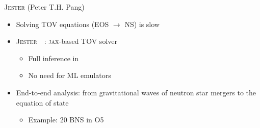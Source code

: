 \documentclass[usenames,dvipsnames,t]{beamer}
\newcommand{\ghlink}[1]{\href{https://github.com/#1}{\textcolor{black}{\faGithub}}}
\begin{document}
\begin{frame}{\textsc{Jester} \small (Peter T.H. Pang) \normalsize}
  \def\x{2mm}

  \begin{itemize}


    \item Solving TOV equations (EOS $\rightarrow$ NS) is slow

    \vspace{\x}

    \item<2-> \textsc{Jester}~\ghlink{nuclear-multimessenger-astronomy/jester}~\cite{Wouters:2025zju}: \textsc{jax}-based TOV solver
    \begin{itemize}
      \item Full inference in 
      \item No need for ML emulators
    \end{itemize}

    \vspace{\x}

    \item<3-> End-to-end analysis: from gravitational waves of neutron star mergers to the equation of state
    \begin{itemize}
      \item Example: 20 BNS in O5
    \end{itemize}
  \end{itemize}

  \vspace{-3mm}


\end{frame}
\end{document}
